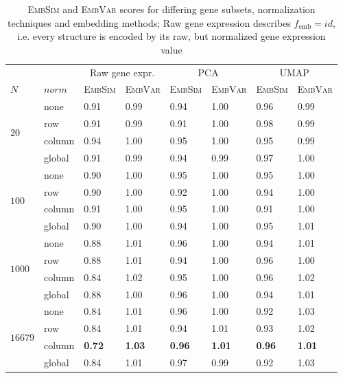 \documentclass[]{article}
\begin{document}
\begin{table}
	\centering
	\renewcommand{\arraystretch}{1.2}
	
	\begin{tabular}{|ll|l|l|l|l|l|l|}
		\hline
		&&\multicolumn{2}{c|}{Raw gene expr. }&\multicolumn{2}{c|}{PCA}&\multicolumn{2}{c|}{UMAP}\\
		$N$&$norm$&\textsc{EmbSim}&\textsc{EmbVar}&\textsc{EmbSim}&\textsc{EmbVar}&\textsc{EmbSim}&\textsc{EmbVar}\\
		\hline
		\multirow{4}{*}{$20$}&none&0.91&0.99&0.94&1.00&0.96&0.99\\
		&row&0.91&0.99&0.91&1.00&0.98&0.99\\
		&column&0.94&1.00&0.95&1.00&0.95&0.99\\
		&global&0.91&0.99&0.94&0.99&0.97&1.00\\
		\hline
		\multirow{4}{*}{$100$}&none&0.90&1.00&0.95&1.00&0.95&1.00\\
		&row&0.90&1.00&0.92&1.00&0.94&1.00\\
		&column&0.91&1.00&0.95&1.00&0.91&1.00\\
		&global&0.90&1.00&0.94&1.00&0.95&1.01\\
		\hline
		\multirow{4}{*}{$1000$}&none&0.88&1.01&0.96&1.00&0.94&1.01\\
		&row&0.88&1.01&0.94&1.00&0.96&1.00\\
		&column&0.84&1.02&0.95&1.00&0.96&1.02\\
		&global&0.88&1.00&0.96&1.00&0.94&1.01\\
		\hline
		\multirow{4}{*}{$16679$}&none&0.84&1.01&0.96&1.00&0.92&1.03\\
		&row&0.84&1.01&0.94&1.01&0.93&1.02\\
		&column&\textbf{0.72}&\textbf{1.03}&\textbf{0.96}&\textbf{1.01}&\textbf{0.96}&\textbf{1.01}\\
		&global&0.84&1.01&0.97&0.99&0.92&1.03\\
		\hline
		
	\end{tabular}
	\caption[\textsc{EmbSim} and \textsc{EmbVar} scores for differing gene subsets, normalization techniques and embedding methods]{\textsc{EmbSim} and \textsc{EmbVar} scores for differing gene subsets, normalization techniques and embedding methods; Raw gene expression describes $f_\text{emb} = id $, i.e. every structure is encoded by its raw, but normalized gene expression value}
	\label{tab:gen_red_baseline}
\end{table}
\end{document}
